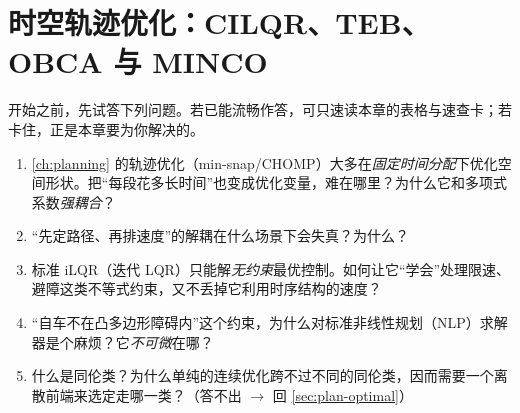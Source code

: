 \chapter{时空轨迹优化：CILQR、TEB、OBCA 与 MINCO}
\label{ch:st-trajopt}


\begin{practice}[前置自测]
开始之前，先试答下列问题。若已能流畅作答，可只速读本章的表格与速查卡；若卡住，正是本章要为你解决的。
\begin{enumerate}
  \item \cref{ch:planning} 的轨迹优化（min-snap/CHOMP）大多在\emph{固定时间分配}下优化空间形状。把“每段花多长时间”也变成优化变量，难在哪里？为什么它和多项式系数\emph{强耦合}？
  \item “先定路径、再排速度”的解耦在什么场景下会失真？为什么？
  \item 标准 iLQR（迭代 LQR）只能解\emph{无约束}最优控制。如何让它“学会”处理限速、避障这类不等式约束，又不丢掉它利用时序结构的速度？
  \item “自车不在凸多边形障碍内”这个约束，为什么对标准非线性规划（NLP）求解器是个麻烦？它\emph{不可微}在哪？
  \item 什么是同伦类？为什么单纯的连续优化跨不过不同的同伦类，因而需要一个离散前端来选定走哪一类？（答不出 $\to$ 回 \cref{sec:plan-optimal}）
\end{enumerate}
\end{practice}

